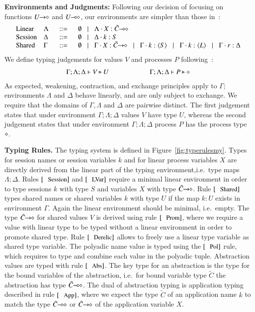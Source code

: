 {\bf Environments and Judgments:}
Following our decision of focusing on functions
$U\!\! \rightarrow\!\! \diamond$ and $U\!\! \multimap\!\! \diamond$, our environments are
simpler than those in~\cite{tlca07}:
%
\[
\begin{array}{llcl}
	\text{Linear} & \Lambda & \bnfis & \emptyset \bnfbar \Lambda \cat \varp{X}: \lhot{\tilde{C}}\\
	\text{Session} & \Delta & \bnfis & \emptyset \bnfbar \Delta \cat k:S \\
	\text{Shared} & \Gamma & \bnfis & \emptyset \bnfbar \Gamma \cat \varp{X}: \shot{\tilde{C}} \bnfbar \Gamma \cat k: \chtype{S} \bnfbar \Gamma \cat k: \chtype{L} \bnfbar \Gamma \cat r: \Delta
\end{array}
\]
%
\noi We define typing judgements for values $V$
and processes $P$ following~\cite{tlca07}:
%
\[	\begin{array}{c}
		\Gamma; \Lambda; \Delta \vdash V \triangleright U \qquad \qquad \qquad \Gamma; \Lambda; \Delta \vdash P \triangleright \diamond
	\end{array}
\]
%
\noi As expected, weakening, contraction, and exchange principles apply to $\Gamma$;
environments $\Lambda$ and $\Delta$ behave linearly, and are only subject to exchange.
We require that the domains of $\Gamma, \Lambda$ and $\Delta$ are pairwise distinct.
The first judgement states that under environment $\Gamma; \Lambda; \Delta$
values $V$ have type $U$,
whereas the second judgement states that under environment $\Gamma; \Lambda; \Delta$
process $P$ has the process type $\diamond$.



{\bf Typing Rules.}
The typing system is defined in Figure~\ref{fig:typerulesmy}.
Types for session names or session variables $k$ and
for linear process variables $X$ are
directly derived from the linear part of the typing
environment,i.e.~type maps $\Lambda; \Delta$.
Rules $\trule{Session}$ and $\trule{LVar}$ require
a minimal linear environment in order to type
sessions $k$ with type $S$ and variables $X$ with
type $\tilde{C}\!\! \rightarrow\!\! \diamond$. Rule $\trule{Shared}$
types shared names or shared variables $k$ with
type $U$ if the map $k:U$ exists in environment
$\Gamma$. Again the linear environment should
be minimal, i.e.~empty.
The type $\tilde{C}\!\! \rightarrow\!\! \diamond$ for shared values $V$
is derived using rule $\trule{Prom}$, where we require
a value with linear type to be typed without a linear
environment in order to promote shared type.
Rule $\trule{Derelic}$ allows to freely use a linear
type variable as shared type variable. The polyadic
name value is typed using the $\trule{Pol}$ rule,
which requires to type and combine each value in the
polyadic tuple.
Abstraction values are typed with rule $\trule{Abs}$.
The key type for an abstraction is the type for
the bound variables of the abstraction, i.e.~for
bound variable type $\tilde{C}$ the abstraction
has type $\tilde{C}\!\! \multimap\!\! \diamond$.
The dual of abstraction typing is application typing
described in rule $\trule{App}$, where we expect
the type $\tilde{C}$ of an application name $k$ 
to match the type $\tilde{C}\!\! \multimap\!\! \diamond$ or $\tilde{C}\!\! \rightarrow\!\! \diamond$
of the application variable $X$.

